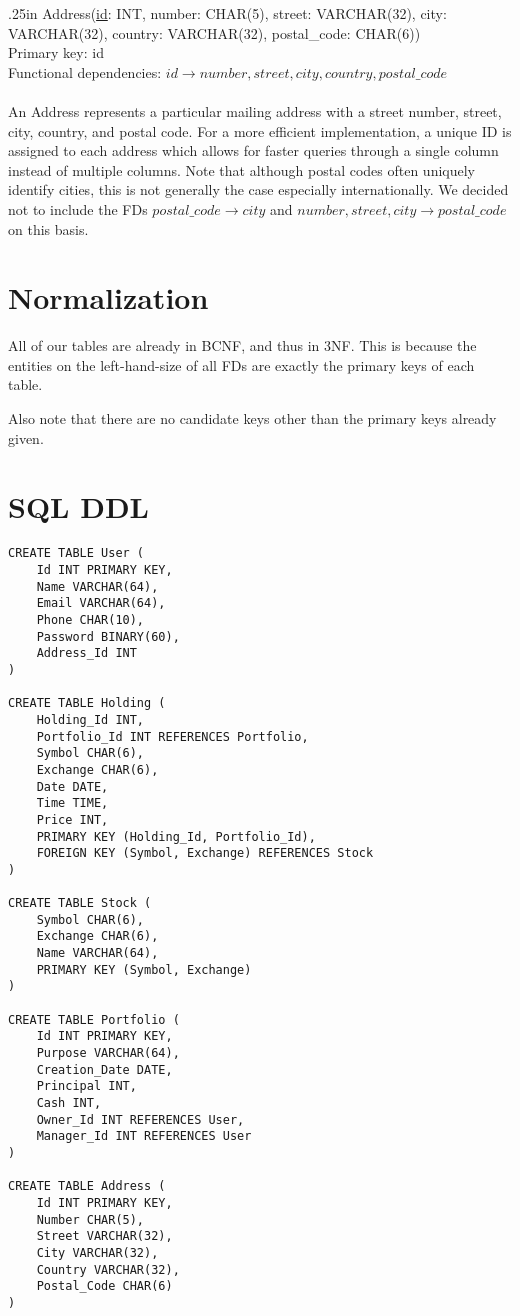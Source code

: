 \documentclass[letterpaper]{report}
\begin{document}
\hangindent .25in
{\sffamily Address(\underline{id}: INT, number: CHAR(5), street: VARCHAR(32), city: VARCHAR(32), country: VARCHAR(32), postal\_code: CHAR(6))}\\
Primary key: {\sffamily id} \\
Functional dependencies: $id \to number, street, city, country, postal\_code$ \\\\
An {\sffamily Address} represents a particular mailing address with a street number, street, city, country, and postal code. For a more efficient implementation, a unique ID is assigned to each address which allows for faster queries through a single column instead of multiple columns. Note that although postal codes often uniquely identify cities, this is not generally the case especially internationally. We decided not to include the FDs $postal\_code \to city$ and $number, street, city \to postal\_code$ on this basis.

\section*{Normalization}
All of our tables are already in BCNF, and thus in 3NF. This is because the entities on the left-hand-size of all FDs are exactly the primary keys of each table.

Also note that there are no candidate keys other than the primary keys already given.

\section*{SQL DDL}
\begin{verbatim}
CREATE TABLE User (
    Id INT PRIMARY KEY,
    Name VARCHAR(64),
    Email VARCHAR(64),
    Phone CHAR(10),
    Password BINARY(60),
    Address_Id INT
)

CREATE TABLE Holding (
    Holding_Id INT,
    Portfolio_Id INT REFERENCES Portfolio,
    Symbol CHAR(6),
    Exchange CHAR(6),
    Date DATE,
    Time TIME,
    Price INT,
    PRIMARY KEY (Holding_Id, Portfolio_Id),
    FOREIGN KEY (Symbol, Exchange) REFERENCES Stock
)

CREATE TABLE Stock (
    Symbol CHAR(6),
    Exchange CHAR(6),
    Name VARCHAR(64),
    PRIMARY KEY (Symbol, Exchange)
)

CREATE TABLE Portfolio (
    Id INT PRIMARY KEY,
    Purpose VARCHAR(64),
    Creation_Date DATE,
    Principal INT,
    Cash INT,
    Owner_Id INT REFERENCES User,
    Manager_Id INT REFERENCES User
)

CREATE TABLE Address (
    Id INT PRIMARY KEY,
    Number CHAR(5),
    Street VARCHAR(32),
    City VARCHAR(32),
    Country VARCHAR(32),
    Postal_Code CHAR(6)
)
\end{verbatim}
\end{document}
